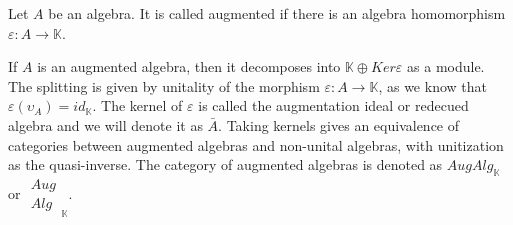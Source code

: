 \documentclass[../thesis.tex]{subfiles}
\begin{document}
            \begin{center}
            \end{center}

            \begin{definition}
                Let $A$ be an algebra. It is called augmented if there is an algebra homomorphism $\varepsilon : A \rightarrow \mathbb{K}$.
            \end{definition}

            If $A$ is an augmented algebra, then it decomposes into $\mathbb{K}\oplus Ker\varepsilon$ as a module. The splitting is given by unitality of the morphism $\varepsilon: A \rightarrow \mathbb{K}$, as we know that $\varepsilon(\upsilon_A) = id_{\mathbb{K}}$. The kernel of $\varepsilon$ is called the augmentation ideal or redecued algebra and we will denote it as $\bar{A}$. Taking kernels gives an equivalence of categories between augmented algebras and non-unital algebras, with unitization as the quasi-inverse. The category of augmented algebras is denoted as $AugAlg_\mathbb{K}$ or $\substack{Aug \\ Alg}_\mathbb{K}$.
\end{document}
